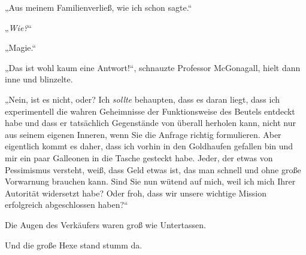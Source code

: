 

„Aus meinem Familienverließ, wie ich schon sagte.“

„\emph{Wie?}“

„Magie.“

„Das ist wohl kaum eine Antwort!“, schnauzte Professor McGonagall, hielt dann inne und blinzelte.

„Nein, ist es nicht, oder? Ich \emph{sollte} behaupten, dass es daran liegt, dass ich experimentell die wahren Geheimnisse der Funktionsweise des Beutels entdeckt habe und dass er tatsächlich Gegenstände von überall herholen kann, nicht nur aus seinem eigenen Inneren, wenn Sie die Anfrage richtig formulieren. Aber eigentlich kommt es daher, dass ich vorhin in den Goldhaufen gefallen bin und mir ein paar Galleonen in die Tasche gesteckt habe.
Jeder, der etwas von Pessimismus versteht, weiß, dass Geld etwas ist, das man schnell und ohne große Vorwarnung brauchen kann. Sind Sie nun wütend auf mich, weil ich mich Ihrer Autorität widersetzt habe? Oder froh, dass wir unsere wichtige Mission erfolgreich abgeschlossen haben?“

Die Augen des Verkäufers waren groß wie Untertassen.

Und die große Hexe stand stumm da.

